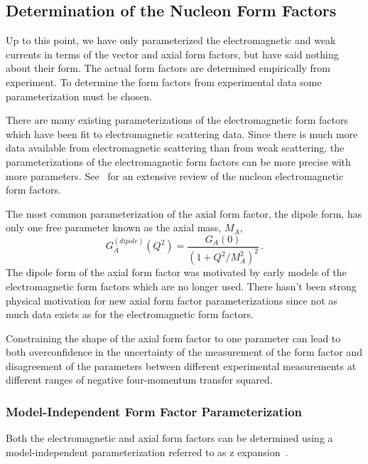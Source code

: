 \subsection{Determination of the Nucleon Form Factors} \label{sec:formfactorforms}

  Up to this point, we have only parameterized the electromagnetic and weak
  currents in terms of the vector and axial form factors, but have said nothing
  about their form. The actual form factors are determined empirically from
  experiment. To determine the form factors from experimental data some
  parameterization must be chosen.

  There are many existing parameterizations of the electromagnetic form factors
  which have been fit to electromagnetic scattering data. Since there is much
  more data available from electromagnetic scattering than from weak
  scattering, the parameterizations of the electromagnetic form factors can be
  more precise with more parameters.
  See~\cite{Perdrisat:2006hj} for an extensive review of
  the nucleon electromagnetic form factors.
  
  The most common parameterization of the axial form factor, the dipole form,
  has only one free parameter known as the axial mass, $M_A$,
  \begin{equation}
    G_A^{(dipole)}(Q^2) = \frac{G_A(0)}{(1+Q^2/M_A^2)^2} \,.
  \end{equation}
  The dipole form of the axial form factor was motivated by early models of the
  electromagnetic form factors which are no longer used. There hasn't been
  strong physical motivation for new axial form factor parameterizations since
  not as much data exists as for the electromagnetic form factors.

  Constraining the shape of the axial form factor to one parameter can lead to
  both overconfidence in the uncertainty of the measurement of the form factor
  and disagreement of the parameters between different experimental
  measurements at different ranges of negative four-momentum transfer squared.

  \subsubsection{Model-Independent Form Factor Parameterization}

  Both the electromagnetic and axial form factors can be determined using a
  model-independent parameterization referred to as z
  expansion~\cite{Boyd:1997qw}.

